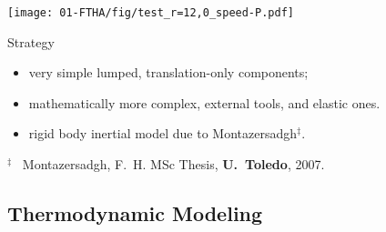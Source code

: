     \begin{frame}\vspace*{-2em}
        \begin{center}
            \noindent\hspace*{-4.5mm}%
            \texttt{[image: 01-FTHA/fig/test\_r=12,0\_speed-P.pdf]}
        \end{center}
    \end{frame}

    \begin{frame}{Strategy}\vspace*{-2em}
        \\[\medskipamount]
        \vspace*\medskipamount
        \begin{itemize}
            \item<1->  very simple \alert{lumped}, translation-\alert{only} components;
            \item<1->  mathematically more complex, external tools, and elastic ones.
        \end{itemize}
        \vspace*\medskipamount
        \vspace*\medskipamount
        \begin{itemize}
            \item<1->  rigid body inertial model due to \alert{Montazersadgh}$^\ddagger$.
        \end{itemize}
        \vspace*\medskipamount
        {\footnotesize$^\ddagger$~\color{Lgre}
        Montazersadgh, F.~H. MSc Thesis, \textbf{U.~Toledo}, 2007.}
    \end{frame}

\subsection{Thermodynamic Modeling}

